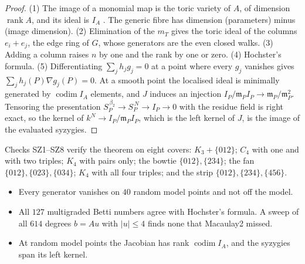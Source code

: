 \documentclass[11pt]{article}
\theoremstyle{definition}\newtheorem{definition}[theorem]{Definition}\newtheorem{remark}[theorem]{Remark}\newtheorem{example}[theorem]{Example}
\begin{document}
\begin{proof}
(1) The image of a monomial map is the toric variety of $A$, of dimension $\operatorname{rank}A$, and its ideal is $I_A$
\cite[Lemma 4.1]{Sturmfels1996}. The generic fibre has dimension (parameters) minus (image dimension). (2) Elimination of the $m_T$ gives
the toric ideal of the columns $e_i+e_j$, the edge ring of $G$, whose generators are the even closed walks. (3) Adding a column raises
$n$ by one and the rank by one or zero. (4) Hochster's formula. (5) Differentiating $\sum_jh_jg_j=0$ at a point where every $g_j$
vanishes gives $\sum_jh_j(P)\nabla g_j(P)=0$. At a smooth point the localised ideal is minimally generated by $\operatorname{codim}I_A$
elements, and $J$ induces an injection $I_P/\mathfrak m_PI_P\to\mathfrak m_P/\mathfrak m_P^2$. Tensoring the presentation
$S_P^{\,\beta_2}\to S_P^{\,N}\to I_P\to0$ with the residue field is right exact, so the kernel of $k^N\to I_P/\mathfrak m_PI_P$, which
is the left kernel of $J$, is the image of the evaluated syzygies.
\end{proof}

Checks SZ1--SZ8 verify the theorem on eight covers: $K_3+\{012\}$; $C_4$ with one and with two triples; $K_4$ with pairs only; the
bowtie $\{012\},\{234\}$; the fan $\{012\},\{023\},\{034\}$; $K_4$ with all four triples; and the strip $\{012\},\{234\},\{456\}$.
\begin{itemize}
\item Every generator vanishes on $40$ random model points and not off the model.
\item All $127$ multigraded Betti numbers agree with Hochster's formula. A sweep of all $614$ degrees $b=Au$ with $|u|\le4$ finds none
  that Macaulay2 missed.
\item At random model points the Jacobian has rank $\operatorname{codim}I_A$, and the syzygies span its left kernel.
\end{itemize}
\end{document}
